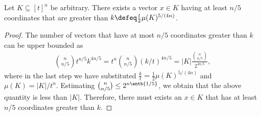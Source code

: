 \begin{lemma}
\label{lem:find-prod}
Let $K\subseteq [t]^n$ be arbitrary. 
There exists a vector $x\in K$ having at least $n/5$ 
coordinates that are greater than 
$k\defeq\frac{t}{2}\mu(K)^{5/(4n)}$.
\end{lemma}
\begin{proof}
The number of vectors that have at most $n/5$ coordinates 
greater than $k$ can be upper bounded as 
\begin{align*}
{n\choose n/5} t^{n/5} k^{4n/5} 
= t^n {n\choose n/5} (k/t)^{4n/5} 
= |K|\frac{{n \choose n/5}}{2^{4n /5}},
\end{align*}
where in the last step we have substituted
$\frac{k}{t}=\frac{1}{2}\mu(K)^{5/(4n)}$ and 
$\mu(K) = |K| / t^n$.
Estimating ${n\choose n/5}\le 2^{n\entb{1/5}}$, 
we obtain that the above quantity is less than $|K|$.
Therefore, there must exists an $x\in K$ that has at least 
$n/5$ coordinates greater than $k$.
\end{proof}

